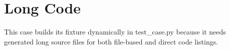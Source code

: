 \documentclass[a4paper,12pt]{report}
\begin{document}
\chapter{Long Code}
This case builds its fixture dynamically in test_case.py because it needs
generated long source files for both file-based and direct code listings.
\end{document}
